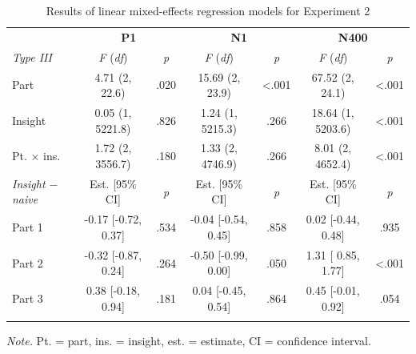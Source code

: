 \documentclass[
  english,
  man,floatsintext]{apa7}
\begin{document}
\begin{table}[tbp]

\begin{center}
\begin{threeparttable}

\caption{\label{tab:exp2-output}Results of linear mixed-effects regression models for Experiment 2}

\footnotesize{

\begin{tabular}{lcccccc}
\toprule
 & \multicolumn{2}{c}{\textbf{P1}} & \multicolumn{2}{c}{\textbf{N1}} & \multicolumn{2}{c}{\textbf{N400}} \\
\cmidrule(r){2-3} \cmidrule(r){4-5} \cmidrule(r){6-7}
\textit{Type III} & \textit{F} (\textit{df}) & \textit{p} & \textit{F} (\textit{df}) & \textit{p} & \textit{F} (\textit{df}) & \textit{p}\\
\midrule
Part & 4.71 (2,   22.6) & .020 & 15.69 (2,   23.9) & <.001 & 67.52 (2,   24.1) & <.001\\
Insight & 0.05 (1, 5221.8) & .826 & 1.24 (1, 5215.3) & .266 & 18.64 (1, 5203.6) & <.001\\
Pt. × ins. & 1.72 (2, 3556.7) & .180 & 1.33 (2, 4746.9) & .266 & 8.01 (2, 4652.4) & <.001\\
\textit{Insight $-$  naive} & Est. [95\% CI] & \textit{p} & Est. [95\% CI] & \textit{p} & Est. [95\% CI] & \textit{p}\\ \midrule
Part 1 & -0.17 [-0.72, 0.37] & .534 & -0.04 [-0.54, 0.45] & .858 & 0.02 [-0.44, 0.48] & .935\\
Part 2 & -0.32 [-0.87, 0.24] & .264 & -0.50 [-0.99, 0.00] & .050 & 1.31 [ 0.85, 1.77] & <.001\\
Part 3 & 0.38 [-0.18, 0.94] & .181 & 0.04 [-0.45, 0.54] & .864 & 0.45 [-0.01, 0.92] & .054\\
\bottomrule
\addlinespace
\end{tabular}

}

\begin{tablenotes}[para]
\normalsize{\textit{Note.} Pt. = part, ins. = insight, est. = estimate, CI = confidence interval.}
\end{tablenotes}

\end{threeparttable}
\end{center}

\end{table}
\end{document}
